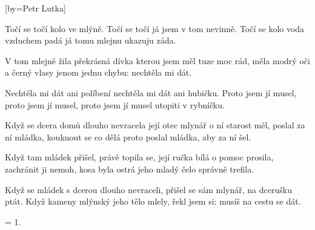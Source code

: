 [by={Petr Lutka}]

\beginverse{}
Točí se točí kolo ve mlýně.
Točí se točí já jsem v tom nevinně.
Točí se kolo voda vzduchem padá
já tomu mlejnu ukazuju záda.
\endverse{}

\beginverse{}
V tom mlejně žila překrásná dívka
kterou jsem měl tuze moc rád,
měla modrý oči a černý vlasy
jenom jednu chybu: nechtěla mi dát.
\endverse{}

\beginverse{}
Nechtěla mi dát ani políbení
nechtěla mi dát ani hubičku.
Proto jsem jí musel, proto jsem jí musel,
proto jsem jí musel utopiti v rybníčku.
\endverse{}

\beginverse{}
Když se dcera domů dlouho nevracela
její otec mlynář o ní starost měl,
poslal za ní mládka, kouknout se co dělá
proto poslal mládka, aby za ní šel.
\endverse{}

\beginverse{}
Když tam mládek přišel, právě topila se,
její ručka bílá o pomoc prosila,
zachránit ji nemoh, kosa byla ostrá
jeho mladý čelo správně trefila.
\endverse{}

\beginverse{}
Když se mládek s dcerou dlouho nevraceli,
přišel se sám mlynář, na dcerušku ptát.
Když kameny mlýnský jeho tělo mlely,
řekl jsem si: musíš na cestu se dát.
\endverse{}

\beginverse{}
= 1.
\endverse{}

\endsong{}
